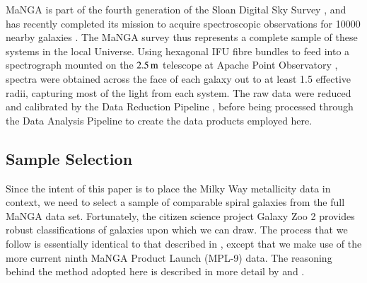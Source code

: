 \documentclass[fleqn,usenatbib]{mnras}
\begin{document}
MaNGA \citep{Bundy2015OVERVIEWOBSERVATORY} is part of the fourth generation of the Sloan Digital Sky Survey \citep[SDSS-IV;][]{Blanton2017SloanUniverse}, and has recently completed its mission to acquire spectroscopic observations for 10000 nearby galaxies \citep{Yan2016SDSS-IVQuality, Wake2017TheConsiderations}. The MaNGA survey thus represents a complete sample of these systems in the local Universe. Using hexagonal IFU fibre bundles \citep{Law2015OBSERVINGSURVEY} to feed into a spectrograph \citep{Smee2013THESURVEY, Drory2015THETELESCOPE} mounted on the $2.5\,{\rm m}$ telescope at Apache Point Observatory \citep{Gunn2006TheSurvey}, spectra were obtained across the face of each galaxy out to at least 1.5 effective radii, capturing most of the light from each system. The raw data were reduced and calibrated \citep{Yan2016SDSS-IV/MaNGA:TECHNIQUE} by the Data Reduction Pipeline \citep[DRP;][]{Law2016TheSurvey}, before being processed through the Data Analysis Pipeline \citep[DAP;][]{Westfall2019TheOverview, Belfiore2019TheModeling} to create the data products employed here.

\subsection{Sample Selection}
\label{subsec:Sample Selection}

Since the intent of this paper is to place the Milky Way metallicity data in context, we need to select a sample of comparable spiral galaxies from the full MaNGA data set. Fortunately, the citizen science project Galaxy Zoo 2 \citep[GZ2;][]{Willett2013GalaxySurvey} provides robust classifications of galaxies upon which we can draw. The process that we follow is essentially identical to that described in \citet{Peterken2020SDSS-IVGalaxies}, except that we make use of the more current ninth MaNGA Product Launch (MPL-9) data. The reasoning behind the method adopted here is described in more detail by \citet{Willett2013GalaxySurvey} and \citet{Hart2016GalaxyBias}.
\end{document}
